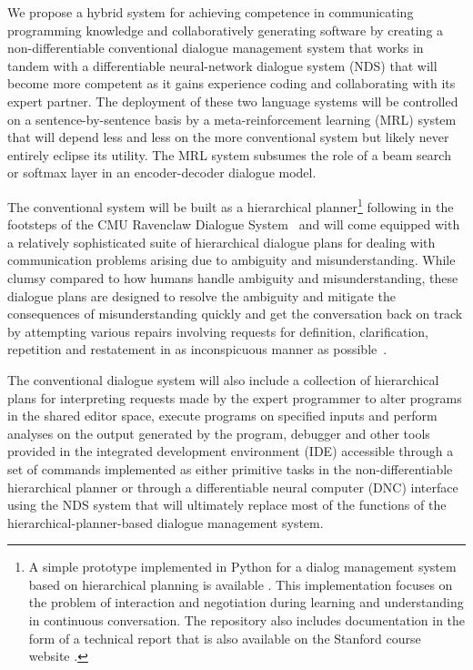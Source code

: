 We propose a hybrid system for achieving competence in communicating programming knowledge and collaboratively generating software by creating a non-differentiable conventional dialogue management system that works in tandem with a differentiable neural-network dialogue system (NDS) that will become more competent as it gains experience coding and collaborating with its expert partner. The deployment of these two language systems will be controlled on a sentence-by-sentence basis by a meta-reinforcement learning (MRL) system that will depend less and less on the more conventional system but likely never entirely eclipse its utility. The MRL system subsumes the role of a beam search or softmax layer in an encoder-decoder dialogue model. 


The conventional system will be built as a hierarchical planner\footnote{%
% 
  A simple prototype implemented in Python for a dialog management system based on hierarchical planning is available {}. This implementation focuses on the problem of interaction and negotiation during learning and understanding in continuous conversation. The repository also includes documentation in the form of a technical report that is also available on the Stanford course website {}.}
% 
following in the footsteps of the CMU Ravenclaw Dialogue System~\cite{BohusandRudnickyCSL-09} and will come equipped with a relatively sophisticated suite of hierarchical dialogue plans for dealing with communication problems arising due to ambiguity and misunderstanding. While clumsy compared to how humans handle ambiguity and misunderstanding, these dialogue plans are designed to resolve the ambiguity and mitigate the consequences of misunderstanding quickly and get the conversation back on track by attempting various repairs involving requests for definition, clarification, repetition and restatement in as inconspicuous manner as possible~\cite{BohusPhD-07}.

The conventional dialogue system will also include a collection of hierarchical plans for interpreting requests made by the expert programmer to alter programs in the shared editor space, execute programs on specified inputs and perform analyses on the output generated by the program, debugger and other tools provided in the integrated development environment (IDE) accessible through a set of commands implemented as either primitive tasks in the non-differentiable hierarchical planner or through a differentiable neural computer (DNC) interface using the NDS system that will ultimately replace most of the functions of the hierarchical-planner-based dialogue management system.

